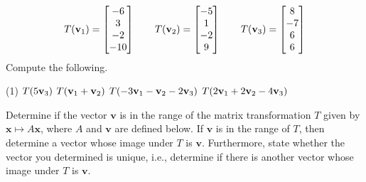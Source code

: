 \begin{align*}
  T(\mathbf v_{1}) = \begin{bmatrix} -6 \\ 3 \\ -2 \\ -10 \end{bmatrix}
  \qquad
  T(\mathbf v_{2}) = \begin{bmatrix} -5 \\ 1 \\ -2 \\ 9 \end{bmatrix}
  \qquad
  T(\mathbf v_{3}) = \begin{bmatrix} 8 \\ -7 \\ 6 \\ 6 \end{bmatrix}
\end{align*}
Compute the following.
\begin{tasks}[resume, style=enumerate](1)
\task
  $T(5\mathbf v_3)$
\task
  $T(\mathbf v_1 + \mathbf v_2)$
\task
  $T(-3\mathbf v_{1} - \mathbf v_{2} - 2\mathbf v_{3})$
\task
  $T(2\mathbf v_1 + 2\mathbf v_2 - 4\mathbf v_3)$
\end{tasks}
Determine if the vector $\mathbf v$ is in the range of the matrix
transformation $T$ given by $\mathbf x \mapsto A \mathbf x$, where $A$
and $\mathbf v$ are defined below.  If $\mathbf v$ is in the range of
$T$, then determine a vector whose image under $T$ is $\mathbf v$.
Furthermore, state whether the vector you determined is unique, i.e.,
determine if there is another vector whose image under $T$ is $\mathbf
v$.
